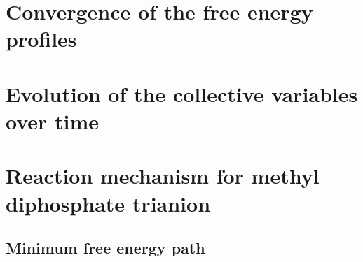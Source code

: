
\clearpage
\section{Convergence of the free energy profiles}




\clearpage
\section{Evolution of the collective variables over time}




\clearpage
\section{Reaction mechanism for methyl diphosphate trianion}



\subsection{Minimum free energy path}

